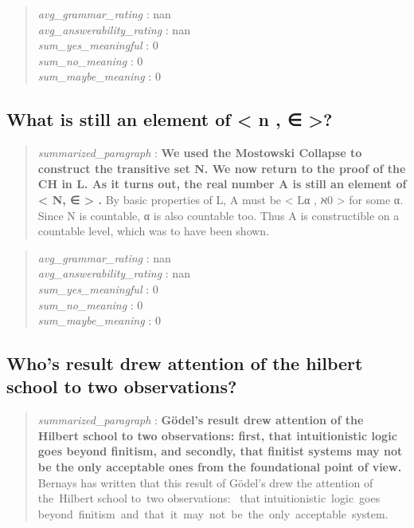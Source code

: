 \begin{quote}
\emph{avg\_grammar\_rating} : nan\\
\emph{avg\_answerability\_rating} : nan\\
\emph{sum\_yes\_meaningful} : 0\\
\emph{sum\_no\_meaning} : 0\\
\emph{sum\_maybe\_meaning} : 0
\end{quote}

\hypertarget{what-is-still-an-element-of-n}{%
\subsection{What is still an element of \textless{} n , ∈
\textgreater?}\label{what-is-still-an-element-of-n}}

\begin{quote}
\emph{summarized\_paragraph} : \textbf{We used the Mostowski Collapse to
construct the transitive set N. We now return to the proof of the CH in
L. As it turns out, the real number A is still an element of \textless{}
N, ∈ \textgreater{} .} By basic properties of L, A must be \textless{}
Lα , ℵ0 \textgreater{} for some α. Since N is countable, α is also
countable too. Thus A is constructible on a countable level, which was
to have been shown.
\end{quote}

\begin{quote}
\emph{avg\_grammar\_rating} : nan\\
\emph{avg\_answerability\_rating} : nan\\
\emph{sum\_yes\_meaningful} : 0\\
\emph{sum\_no\_meaning} : 0\\
\emph{sum\_maybe\_meaning} : 0
\end{quote}

\hypertarget{whos-result-drew-attention-of-the-hilbert-school-to-two-observations}{%
\subsection{Who's result drew attention of the hilbert school to two
observations?}\label{whos-result-drew-attention-of-the-hilbert-school-to-two-observations}}

\begin{quote}
\emph{summarized\_paragraph} : \textbf{Gödel's result drew attention of
the Hilbert school to two observations: first, that intuitionistic logic
goes beyond finitism, and secondly, that finitist systems may not be the
only acceptable ones from the foundational point of view.} Bernays has
written that this result of Gödel's drew the attention of the~Hilbert
school to~two observations: ~that intuitionistic~logic~goes
beyond~finitism~and~that~it~may~not~be~the~only~acceptable~system.
\end{quote}

